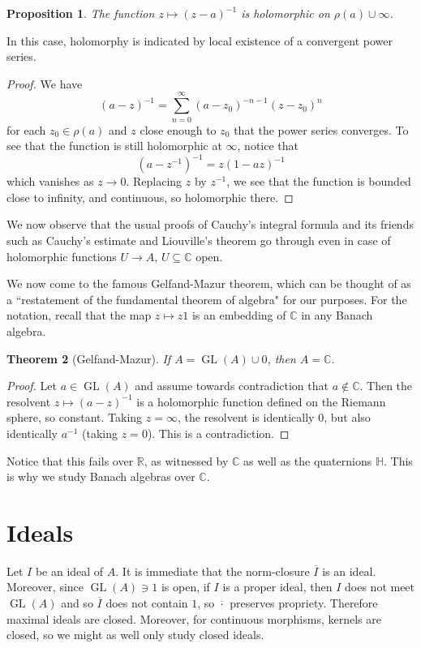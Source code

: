 \documentclass[12pt]{report}
\newcommand{\RR}{\mathbb{R}}
\newcommand{\CC}{\mathbb{C}}
\newcommand{\GL}{\operatorname{GL}}
\newtheorem{theorem}{Theorem}[chapter]
\newtheorem{proposition}[theorem]{Proposition}
\theoremstyle{definition}
\begin{document}
\begin{proposition}
    The function $z \mapsto (z - a)^{-1}$ is holomorphic on $\rho(a) \cup \infty$.
\end{proposition}
    In this case, holomorphy is indicated by local existence of a convergent power series.
\begin{proof}
    We have
    $$(a - z)^{-1} = \sum_{n=0}^\infty (a - z_0)^{-n-1}(z-z_0)^n$$
    for each $z_0 \in \rho(a)$ and $z$ close enough to $z_0$ that the power series converges. To see that the function is still holomorphic at $\infty$, notice that
    $$(a - z^{-1})^{-1} = z(1 - az)^{-1}$$
    which vanishes as $z \to 0$. Replacing $z$ by $z^{-1}$, we see that the function is bounded close to infinity, and continuous, so holomorphic there.
\end{proof}

We now observe that the usual proofs of Cauchy's integral formula and its friends such as Cauchy's estimate and Liouville's theorem go through even in case of holomorphic functions $U \to A$, $U \subseteq \CC$ open. 

We now come to the famous Gelfand-Mazur theorem, which can be thought of as a ``restatement of the fundamental theorem of algebra" for our purposes. For the notation, recall that the map $z \mapsto z1$ is an embedding of $\CC$ in any Banach algebra. 
\begin{theorem}[Gelfand-Mazur]
    If $A = \GL(A) \cup 0$, then $A = \CC$.
\end{theorem}
\begin{proof}
    Let $a \in \GL(A)$ and assume towards contradiction that $a \notin \CC$. Then the resolvent $z \mapsto (a - z)^{-1}$ is a holomorphic function defined on the Riemann sphere, so constant. Taking $z = \infty$, the resolvent is identically $0$, but also identically $a^{-1}$ (taking $z = 0$). This is a contradiction.
\end{proof}
Notice that this fails over $\RR$, as witnessed by $\CC$ as well as the quaternions $\mathbb H$. This is why we study Banach algebras over $\CC$.

\section{Ideals}
Let $I$ be an ideal of $A$. It is immediate that the norm-closure $\overline I$ is an ideal. Moreover, since $\GL(A) \ni 1$ is open, if $I$ is a proper ideal, then $I$ does not meet $\GL(A)$ and so $\overline I$ does not contain $1$, so $\overline \cdot$ preserves propriety. Therefore maximal ideals are closed. Moreover, for continuous morphisms, kernels are closed, so we might as well only study closed ideals.
\end{document}
